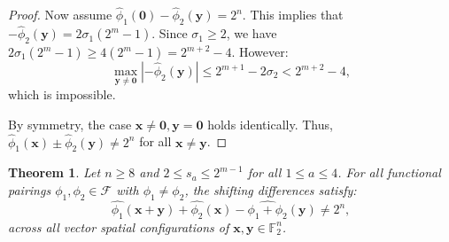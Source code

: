 \documentclass[pdflatex,sn-mathphys-num]{sn-jnl}%
\theoremstyle{thmstyleone}%
\newtheorem{theorem}{Theorem}%
\theoremstyle{thmstyletwo}%
\theoremstyle{thmstylethree}%
\begin{document}
\begin{proof}
Now assume $\widehat{\phi}_1(\mathbf{0}) - \widehat{\phi}_2(\mathbf{y}) = 2^n$. This implies that 
$-\widehat{\phi}_2(\mathbf{y}) = 2\sigma_1(2^m - 1)$.
Since $\sigma_1 \geq 2$, we have $2\sigma_1(2^m - 1) \geq 4(2^m - 1) = 2^{m+2} - 4$. However:
\[
\max_{\mathbf{y} \neq \mathbf{0}} |-\widehat{\phi}_2(\mathbf{y})| \leq 2^{m+1} - 2\sigma_2 < 2^{m+2} - 4,
\]
which is impossible.

By symmetry, the case $\mathbf{x} \neq \mathbf{0}, \mathbf{y} = \mathbf{0}$ holds identically. Thus, $\widehat{\phi}_1(\mathbf{x}) \pm \widehat{\phi}_2(\mathbf{y}) \neq 2^n$ for all $\mathbf{x} \neq \mathbf{y}$.
\end{proof}




\begin{theorem}\label{Thm_Verify_Cond2}
Let $n \geq 8$ and $2 \leq s_a \leq 2^{m-1}$ for all $1 \leq a \leq 4$. For all functional pairings $\phi_1, \phi_2 \in \mathcal{F}$ with $\phi_1 \neq \phi_2$, the shifting differences satisfy:
\[ \widehat{\phi_1}(\mathbf{x}+\mathbf{y})+\widehat{\phi_2}(\mathbf{x})-\widehat{\phi_1+\phi_2}(\mathbf{y})\neq 2^n, \]
across all vector spatial configurations of $\mathbf{x}, \mathbf{y} \in \mathbb{F}_2^n$.
\end{theorem}
\end{document}
